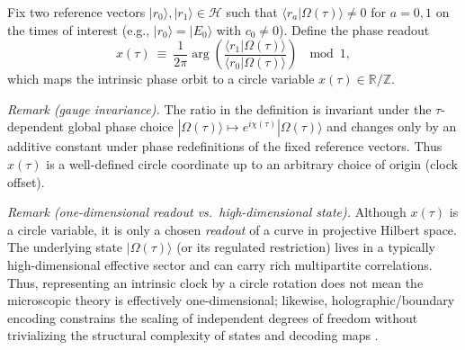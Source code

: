 \begin{definition}
Fix two reference vectors $|r_0\rangle,|r_1\rangle\in\mathcal{H}$ such that $\langle r_a|\Omega(\tau)\rangle\neq 0$ for $a=0,1$ on the times of interest (e.g., $|r_0\rangle=|E_0\rangle$ with $c_0\neq 0$). Define the phase readout
\begin{equation}
    x(\tau)\ \equiv\ \frac{1}{2\pi}\arg\!\left(\frac{\langle r_1|\Omega(\tau)\rangle}{\langle r_0|\Omega(\tau)\rangle}\right)\ \ \bmod 1,
\end{equation}
which maps the intrinsic phase orbit to a circle variable $x(\tau)\in\mathbb{R}/\mathbb{Z}$.
\end{definition}
\noindent\textit{Remark (gauge invariance).} The ratio in the definition is invariant under the $\tau$-dependent global phase choice $|\Omega(\tau)\rangle\mapsto e^{i\chi(\tau)}|\Omega(\tau)\rangle$ and changes only by an additive constant under phase redefinitions of the fixed reference vectors. Thus $x(\tau)$ is a well-defined circle coordinate up to an arbitrary choice of origin (clock offset).
\par
\noindent\textit{Remark (one-dimensional readout vs.\ high-dimensional state).} Although $x(\tau)$ is a circle variable, it is only a chosen \emph{readout} of a curve in projective Hilbert space. The underlying state $|\Omega(\tau)\rangle$ (or its regulated restriction) lives in a typically high-dimensional effective sector and can carry rich multipartite correlations. Thus, representing an intrinsic clock by a circle rotation does not mean the microscopic theory is effectively one-dimensional; likewise, holographic/boundary encoding constrains the scaling of independent degrees of freedom without trivializing the structural complexity of states and decoding maps \cite{NielsenChuang2000}.

